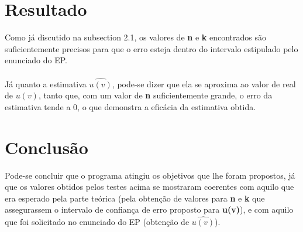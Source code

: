 \documentclass{article}
\begin{document}
\section{Resultado}

    Como já discutido na subsection 2.1, os valores de \textbf{n} e \textbf{k} encontrados são suficientemente precisos para que o erro esteja dentro do intervalo estipulado pelo enunciado do EP.\\
    \\
    Já quanto a estimativa $\hat{u(v)}$, pode-se dizer que ela se aproxima ao valor de real de $u(v)$, tanto que, com um valor de \textbf{n} suficientemente grande, o erro da estimativa tende a 0, o que demonstra a eficácia da estimativa obtida.

\section{Conclusão}

    Pode-se concluir que o programa atingiu os objetivos que lhe foram propostos, já que os valores obtidos pelos testes acima se mostraram coerentes com aquilo que era esperado pela parte teórica (pela obtenção de valores para \textbf{n} e \textbf{k} que assegurassem o intervalo de confiança de erro proposto para \textbf{u(v)}), e com aquilo que foi solicitado no enunciado do EP (obtenção de $\hat{u(v)}$).
\end{document}
